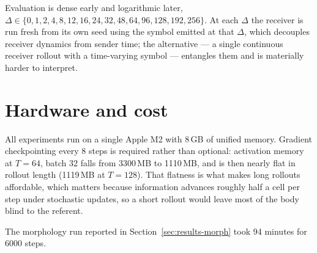 Evaluation is dense early and logarithmic later,
$\Delta \in \{0,1,2,4,8,12,16,24,32,48,64,96,128,192,256\}$. At each $\Delta$ the
receiver is run fresh from its own seed using the symbol emitted at that
$\Delta$, which decouples receiver dynamics from sender time; the alternative --- a
single continuous receiver rollout with a time-varying symbol --- entangles them
and is materially harder to interpret.

\section{Hardware and cost}
\label{app:hardware}

All experiments run on a single Apple M2 with 8\,GB of unified memory. Gradient
checkpointing every 8 steps is required rather than optional: activation memory
at $T=64$, batch 32 falls from 3300\,MB to 1110\,MB, and is then nearly flat in
rollout length (1119\,MB at $T=128$). That flatness is what makes long rollouts
affordable, which matters because information advances roughly half a cell per
step under stochastic updates, so a short rollout would leave most of the body
blind to the referent.

The morphology run reported in Section~\ref{sec:results-morph} took 94 minutes
for 6000 steps.
